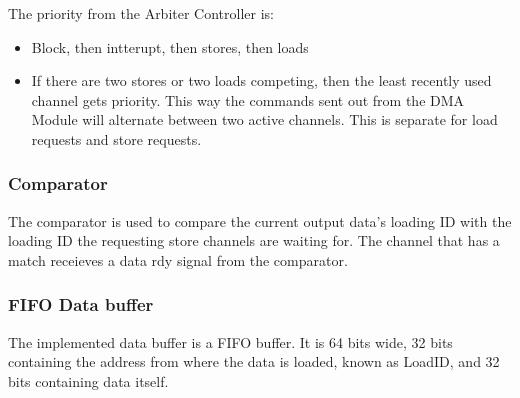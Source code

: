 The priority from the Arbiter Controller is:
\begin{itemize}
    \item Block, then intterupt, then stores, then loads
    \item If there are two stores or two loads competing, then the least recently used channel gets priority.
    This way the commands sent out from the DMA Module will alternate between two active channels. 
    This is separate for load requests and store requests.
\end{itemize}

\subsubsection{Comparator}
The comparator is used to compare the current output data's loading ID with the loading ID the requesting store channels are waiting for.
The channel that has a match receieves a data rdy signal from the comparator. 

\subsubsection{FIFO Data buffer}
The implemented data buffer is a FIFO buffer.
It is 64 bits wide, 32 bits containing the address from where the data is loaded, known as LoadID, and 32 bits containing data itself.


